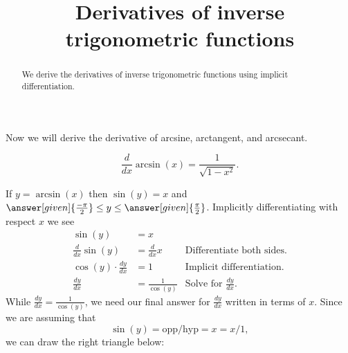 \documentclass{ximera}
\title{Derivatives of inverse trigonometric functions}
\begin{document}
\begin{abstract}
  We derive the derivatives of inverse trigonometric functions using implicit
  differentiation.
\end{abstract}
\maketitle

Now we will derive the derivative of arcsine, arctangent, and
arcsecant.



\begin{theorem}
\[
\frac{d}{dx} \arcsin(x) = \frac{1}{\sqrt{1-x^2}}.
\]
\begin{explanation} 
  If $y=\arcsin(x)$ then $\sin(y) = x$ and $\answer[given]{\frac{-\pi}{2}}\le
  y\le \answer[given]{\frac{\pi}{2}}$.
  Implicitly differentiating with respect $x$ we see
  \begin{align*}
    \sin(y) &= x\\
    \frac{d}{dx} \sin(y) &= \frac{d}{dx} x &\text{Differentiate both sides.}\\
    \cos(y) \cdot \frac{dy}{dx} &= 1 &\text{Implicit differentiation.}\\
    \frac{dy}{dx} &= \frac{1}{\cos(y)} &\text{Solve for $\frac{dy}{dx}$.}
  \end{align*}
  While $\frac{dy}{dx} = \frac{1}{\cos(y)}$, we need our final answer for $\frac{dy}{dx}$ written
  in terms of $x$. Since we are assuming that
  \[
  \sin(y) =\mbox{opp/hyp}= x=x/1,
  \]
  we can draw the right triangle below:
      \begin{image}[2in]
    \end{image}


\end{explanation}
\end{theorem}
\end{document}
